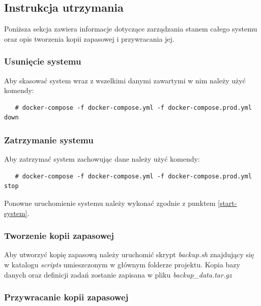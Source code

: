 \documentclass[a4paper,11pt,twoside]{report}
\theoremstyle{definition}
\begin{document}
    \subsection{Instrukcja utrzymania}

        Poniższa sekcja zawiera informacje dotyczące zarządzania stanem całego systemu oraz opis tworzenia kopii zapasowej i przywracania jej.

        \subsubsection{Usunięcie systemu}

            Aby skasować system wraz z wszelkimi danymi zawartymi w nim należy użyć komendy:

            \begin{verbatim}
   # docker-compose -f docker-compose.yml -f docker-compose.prod.yml down
            \end{verbatim}


        \subsubsection{Zatrzymanie systemu}

            Aby zatrzymać system zachowując dane należy użyć komendy:
            
            \begin{verbatim}
   # docker-compose -f docker-compose.yml -f docker-compose.prod.yml stop
            \end{verbatim}

            Ponowne uruchomienie systemu należy wykonać zgodnie z punktem \ref{start-system}.

        \subsubsection{Tworzenie kopii zapasowej}

            Aby utworzyć kopię zapasową należy uruchomić skrypt \textit{backup.sh} znajdujący się w katalogu \textit{scripts} umieszczonym w głównym folderze projektu. 
            Kopia bazy danych oraz definicji zadań zostanie zapisana w pliku \textit{backup\_data.tar.gz}
            
        \subsubsection{Przywracanie kopii zapasowej}
\end{document}
